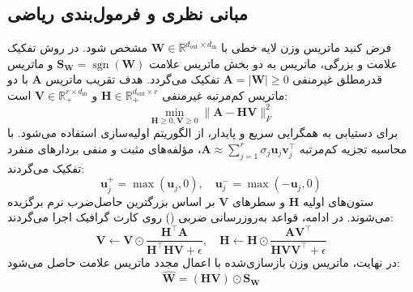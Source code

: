 \subsection{مبانی نظری و فرمول‌بندی ریاضی}
فرض کنید ماتریس وزن لایه خطی با $\mathbf{W} \in \mathbb{R}^{d_{\text{out}} \times d_{\text{in}}}$ مشخص شود. در روش تفکیک علامت و بزرگی، ماتریس به دو بخش ماتریس علامت $\mathbf{S}_{\mathbf{W}} = \operatorname{sgn}(\mathbf{W})$ و ماتریس قدرمطلق غیرمنفی $\mathbf{A} = |\mathbf{W}| \ge 0$ تفکیک می‌گردد. هدف  تقریب ماتریس $\mathbf{A}$ با دو ماتریس کم‌مرتبه غیرمنفی $\mathbf{H} \in \mathbb{R}_{+}^{d_{\text{out}} \times r}$ و $\mathbf{V} \in \mathbb{R}_{+}^{r \times d_{\text{in}}}$ است:
\begin{equation}
\min_{\mathbf{H} \ge 0, \mathbf{V} \ge 0} \|\mathbf{A} - \mathbf{H}\mathbf{V}\|_F^2
\end{equation}
برای دستیابی به همگرایی سریع و پایدار، از الگوریتم اولیه‌سازی  استفاده می‌شود. با محاسبه تجزیه کم‌مرتبه $\mathbf{A} \approx \sum_{j=1}^r \sigma_j \mathbf{u}_j \mathbf{v}_j^\top$، مؤلفه‌های مثبت و منفی بردارهای منفرد تفکیک می‌گردند:
\begin{equation}
\mathbf{u}_j^+ = \max(\mathbf{u}_j, 0), \quad \mathbf{u}_j^- = \max(-\mathbf{u}_j, 0)
\end{equation}
ستون‌های اولیه $\mathbf{H}$ و سطرهای $\mathbf{V}$ بر اساس بزرگترین حاصل‌ضرب نرم برگزیده می‌شوند. در ادامه، قواعد به‌روزرسانی ضربی () روی کارت گرافیک اجرا می‌گردند:
\begin{equation}
\mathbf{V} \leftarrow \mathbf{V} \odot \frac{\mathbf{H}^\top \mathbf{A}}{\mathbf{H}^\top \mathbf{H} \mathbf{V} + \epsilon}, \quad \mathbf{H} \leftarrow \mathbf{H} \odot \frac{\mathbf{A} \mathbf{V}^\top}{\mathbf{H} \mathbf{V} \mathbf{V}^\top + \epsilon}
\end{equation}
در نهایت، ماتریس وزن بازسازی‌شده با اعمال مجدد ماتریس علامت حاصل می‌شود:
\begin{equation}
\hat{\mathbf{W}} = (\mathbf{H}\mathbf{V}) \odot \mathbf{S}_{\mathbf{W}}
\end{equation}

